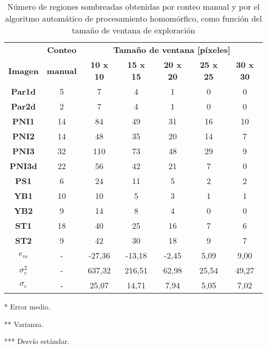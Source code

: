 \begin{table}[]
    \centering
    \begin{threeparttable}[b]
        
        \caption{Número de regiones sombreadas obtenidas por conteo manual y por el algoritmo automático de procesamiento homomórfico, como función del tamaño de ventana de exploración}
        \label{tab:resultados_homomorfico}
        \begin{tabular}{ccccccc}
        \hline
        \hline
                  & \textbf{Conteo}  & \multicolumn{5}{c}{\textbf{Tamaño de ventana [píxeles]}}   \\
            \textbf{Imagen}& \textbf{manual}  & \textbf{10 x 10}     & \textbf{15 x 15}     & \textbf{20 x 20 }   & \textbf{25 x 25}    & \textbf{30 x 30 }   \\ \hline
            \textbf{Par1d}  & 5  & 7      & 4      & 1     & 0     & 0     \\
            \textbf{Par2d}  & 2  & 7      & 4      & 1     & 0     & 0     \\
            \textbf{PNI1}   & 14 & 84     & 49     & 31    & 16    & 10    \\
            \textbf{PNI2}   & 14 & 48     & 35     & 20    & 14    & 7     \\
            \textbf{PNI3}   & 32 & 110    & 73     & 48    & 29    & 9     \\
            \textbf{PNI3d}  & 22 & 56     & 42     & 21    & 7     & 0     \\
            \textbf{PS1}    & 6  & 24     & 11     & 5     & 2     & 2     \\ 
            \textbf{YB1}    & 10 & 10     & 5      & 3     & 1     & 1     \\
            \textbf{YB2}    & 9  & 14     & 8      & 4     & 0     & 0     \\
            \textbf{ST1}    & 18 & 40     & 25     & 16    & 7     & 6     \\
            \textbf{ST2}    & 9  & 42     & 30     & 18    & 9     & 7     \\ \hline
            $e_{m}$\tnote{*}    & -  & -27,36 & -13,18 & -2,45 & 5,09  & 9,00  \\ 
            $\sigma^2_{e}$ \tnote{**}   & -  & 637,32  & 216,51 & 62,98 & 25,54 & 49,27 \\
           $\sigma_{e}$ \tnote{***}   & -  & 25,07  & 14,71  & 7,94  & 5,05  & 7,02  \\ \hline \hline
        \end{tabular}
        \begin{tablenotes}
        \tiny{
                \item [*]Error medio.
                \item [**]Varianza.
                \item [***] Desvío estándar.
                }
        \end{tablenotes}
  \end{threeparttable}
\end{table}
       